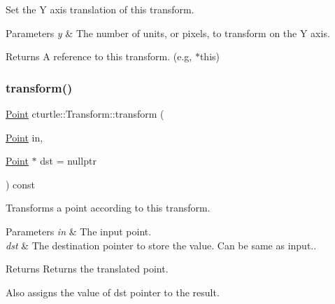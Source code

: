 Set the Y axis translation of this transform. 


\begin{DoxyParams}{Parameters}
{\em y} & The number of units, or pixels, to transform on the Y axis. \\
\hline
\end{DoxyParams}
\begin{DoxyReturn}{Returns}
A reference to this transform. (e.\+g, $\ast$this) 
\end{DoxyReturn}
\mbox{\label{classcturtle_1_1Transform_aa8631732daaddc8336ed29f5462d1fef}} 
\subsubsection{\texorpdfstring{transform()}{transform()}}
{\footnotesize\ttfamily \hyperlink{structcturtle_1_1ivec2}{Point} cturtle\+::\+Transform\+::transform (\begin{DoxyParamCaption}\item[{\hyperlink{structcturtle_1_1ivec2}{Point}}]{in,  }\item[{\hyperlink{structcturtle_1_1ivec2}{Point} $\ast$}]{dst = {\ttfamily nullptr} }\end{DoxyParamCaption}) const\hspace{0.3cm}{\ttfamily [inline]}}



Transforms a point according to this transform. 


\begin{DoxyParams}{Parameters}
{\em in} & The input point. \\
\hline
{\em dst} & The destination pointer to store the value. Can be same as input.. \\
\hline
\end{DoxyParams}
\begin{DoxyReturn}{Returns}
Returns the translated point. 

Also assigns the value of dst pointer to the result. 
\end{DoxyReturn}
\mbox{\label{classcturtle_1_1Transform_aae183c07fb323d0dfe8b3d633d59415c}} 
